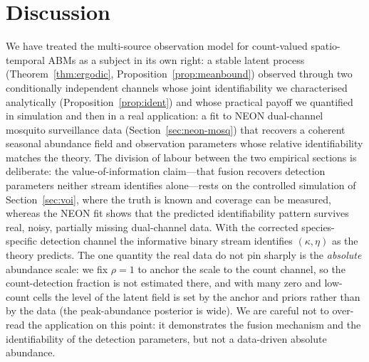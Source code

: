 \documentclass[preprint,12pt]{elsarticle}
\theoremstyle{definition}
\begin{document}
\section{Discussion}
\label{sec:discussion}

We have treated the multi-source observation model for count-valued
spatio-temporal ABMs as a subject in its own right: a stable latent process
(Theorem~\ref{thm:ergodic}, Proposition~\ref{prop:meanbound}) observed
through two conditionally independent channels whose joint identifiability we
characterised analytically (Proposition~\ref{prop:ident}) and whose practical
payoff we quantified in simulation and then in a real application: a fit to NEON
dual-channel mosquito surveillance data (Section~\ref{sec:neon-mosq}) that
recovers a coherent seasonal abundance field and observation parameters whose
relative identifiability matches the theory. The division of labour between the
two empirical sections is deliberate: the value-of-information claim---that
fusion recovers detection parameters neither stream identifies alone---rests on
the controlled simulation of Section~\ref{sec:voi}, where the truth is known and
coverage can be measured, whereas the NEON fit shows that the predicted
identifiability pattern survives real, noisy, partially missing dual-channel
data. With the corrected species-specific detection channel the informative
binary stream identifies $(\kappa,\eta)$ as the theory predicts. The one quantity
the real data do not pin sharply is the \emph{absolute} abundance scale: we fix
$\rho=1$ to anchor the scale to the count channel, so the count-detection
fraction is not estimated there, and with many zero and low-count cells the
level of the latent field is set by the anchor and priors rather than by the data
(the peak-abundance posterior is wide). We are careful not to over-read the
application on this point: it demonstrates the fusion mechanism and the
identifiability of the detection parameters, but not a data-driven absolute
abundance.
\end{document}
